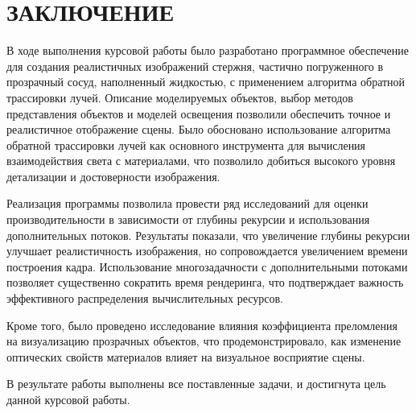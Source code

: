 \section*{ЗАКЛЮЧЕНИЕ}

В ходе выполнения курсовой работы было разработано программное обеспечение для создания реалистичных изображений стержня, частично погруженного в прозрачный сосуд, наполненный жидкостью, с применением алгоритма обратной трассировки лучей. Описание моделируемых объектов, выбор методов представления объектов и моделей освещения позволили обеспечить точное и реалистичное отображение сцены. Было обосновано использование алгоритма обратной трассировки лучей как основного инструмента для вычисления взаимодействия света с материалами, что позволило добиться высокого уровня детализации и достоверности изображения.

Реализация программы позволила провести ряд исследований для оценки производительности в зависимости от глубины рекурсии и использования дополнительных потоков. Результаты показали, что увеличение глубины рекурсии улучшает реалистичность изображения, но сопровождается увеличением времени построения кадра. Использование многозадачности с дополнительными потоками позволяет существенно сократить время рендеринга, что подтверждает важность эффективного распределения вычислительных ресурсов.

Кроме того, было проведено исследование влияния коэффициента преломления на визуализацию прозрачных объектов, что продемонстрировало, как изменение оптических свойств материалов влияет на визуальное восприятие сцены.

В результате работы выполнены все поставленные задачи, и достигнута цель данной курсовой работы.